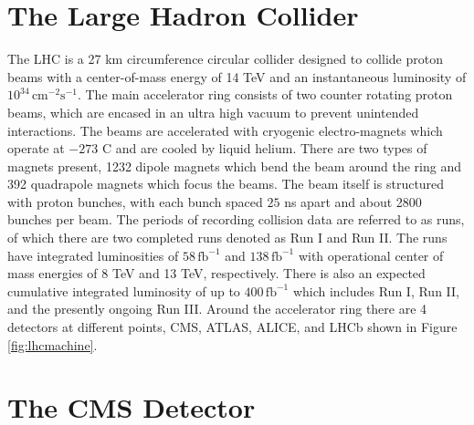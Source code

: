 \section{The Large Hadron Collider}
The LHC is a 27 km circumference circular collider designed to collide proton beams with a center-of-mass energy of 14 TeV and an instantaneous luminosity of $10^{34} \, \text{cm}^{-2}\text{s}^{-1}$\cite{Evans:2008zzb}. The main accelerator ring consists of two counter rotating proton beams, which are encased in an ultra high vacuum to prevent unintended interactions. The beams are accelerated with cryogenic electro-magnets which operate at $-273$ \degree C and are cooled by liquid helium. There are two types of magnets present, 1232 dipole magnets which bend the beam around the ring and 392 quadrapole magnets which focus the beams.  The beam itself is structured with proton bunches, with each bunch spaced $25$ ns apart and about 2800 bunches per beam. The periods of recording collision data are referred to as runs, of which there are two completed runs denoted as Run I and Run II. The runs have integrated luminosities of $58 \, \text{fb}^{-1}$ and $138\, \text{fb}^{-1}$ with operational center of mass energies of 8 TeV and 13 TeV, respectively. There is also an expected cumulative integrated luminosity of up to $400 \,\text{fb}^{-1}$ which includes Run I, Run II, and the presently ongoing Run III. Around the accelerator ring there are 4 detectors at different points, CMS, ATLAS, ALICE, and LHCb shown in Figure \ref{fig:lhcmachine}.




\section{The CMS Detector}

